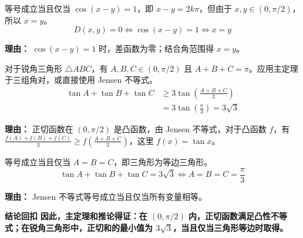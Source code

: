 \begin{proofbox}
\begin{description}[style=nextline, leftmargin=2.8em, labelsep=0.5em, itemsep=0.55em]
    \item[\textbf{步骤五（取等条件）：}] 等号成立当且仅当 $\cos(x-y) = 1$，即 $x-y = 2k\pi$，但由于 $x,y \in (0, \pi/2)$，所以 $x=y$。
    \[
    D(x,y) = 0 \iff \cos(x-y)=1 \iff x=y
    \]
    \par\textbf{理由：}
    $\cos(x-y)=1$ 时，差函数为零；结合角范围得 $x=y$。

    \item[\textbf{步骤六（推广到三角形）：}] 对于锐角三角形 $\triangle ABC$，有 $A,B,C \in (0, \pi/2)$ 且 $A+B+C=\pi$。应用主定理于三组角对，或直接使用 Jensen 不等式。
    \[
    \begin{aligned}
    \tan A + \tan B + \tan C &\geq 3 \tan\left(\frac{A+B+C}{3}\right) \\
    &= 3 \tan\left(\frac{\pi}{3}\right) = 3 \sqrt{3}
    \end{aligned}
    \]
    \par\textbf{理由：}
    正切函数在 $(0, \pi/2)$ 是凸函数，由 Jensen 不等式，对于凸函数 $f$，有 $\frac{f(A)+f(B)+f(C)}{3} \geq f\left(\frac{A+B+C}{3}\right)$，这里 $f(x)=\tan x$。

    \item[\textbf{步骤七（三角形取等）：}] 等号成立当且仅当 $A=B=C$，即三角形为等边三角形。
    \[
    \tan A + \tan B + \tan C = 3\sqrt{3} \iff A=B=C=\frac{\pi}{3}
    \]
    \par\textbf{理由：}
    Jensen 不等式等号成立当且仅当所有变量相等。
\end{description}

\medskip
\textbf{\textcolor{CProof}{结论回扣}}
\textbf{因此，主定理和推论得证：在 $(0, \pi/2)$ 内，正切函数满足凸性不等式；在锐角三角形中，正切和的最小值为 $3\sqrt{3}$，当且仅当三角形等边时取得。}
\end{proofbox}
